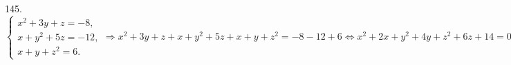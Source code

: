 145. $\begin{cases} x^2+3y+z=-8,\\ x+y^2+5z=-12,\\ x+y+z^2=6.\end{cases}\Rightarrow x^2+3y+z+x+y^2+5z+x+y+z^2=-8-12+6 \Leftrightarrow x^2+2x+y^2+4y+z^2+6z+14=0\Leftrightarrow (x+1)^2+(y+2)^2+(z+3)^2=0\Leftrightarrow \begin{cases} x=-1,\\ y=-2,\\ z=-3.\end{cases}$
\newpage
